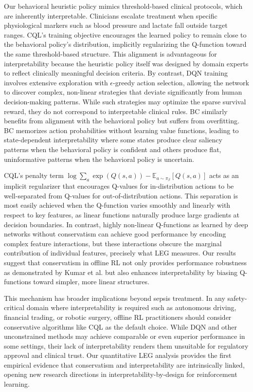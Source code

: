 Our behavioral heuristic policy mimics threshold-based clinical protocols, which are inherently interpretable. Clinicians escalate treatment when specific physiological markers such as blood pressure and lactate fall outside target ranges. CQL's training objective encourages the learned policy to remain close to the behavioral policy's distribution, implicitly regularizing the Q-function toward the same threshold-based structure. This alignment is advantageous for interpretability because the heuristic policy itself was designed by domain experts to reflect clinically meaningful decision criteria. By contrast, DQN training involves extensive exploration with $\epsilon$-greedy action selection, allowing the network to discover complex, non-linear strategies that deviate significantly from human decision-making patterns. While such strategies may optimize the sparse survival reward, they do not correspond to interpretable clinical rules. BC similarly benefits from alignment with the behavioral policy but suffers from overfitting. BC memorizes action probabilities without learning value functions, leading to state-dependent interpretability where some states produce clear saliency patterns when the behavioral policy is confident and others produce flat, uninformative patterns when the behavioral policy is uncertain.

CQL's penalty term $\log \sum_a \exp(Q(s, a)) - \mathbb{E}_{a \sim \pi_\beta} [Q(s, a)]$ acts as an implicit regularizer that encourages Q-values for in-distribution actions to be well-separated from Q-values for out-of-distribution actions. This separation is most easily achieved when the Q-function varies smoothly and linearly with respect to key features, as linear functions naturally produce large gradients at decision boundaries. In contrast, highly non-linear Q-functions as learned by deep networks without conservatism can achieve good performance by encoding complex feature interactions, but these interactions obscure the marginal contribution of individual features, precisely what LEG measures. Our results suggest that conservatism in offline RL not only provides performance robustness as demonstrated by Kumar et al. \citeyearpar{kumar2020cql} but also enhances interpretability by biasing Q-functions toward simpler, more linear structures.

This mechanism has broader implications beyond sepsis treatment. In any safety-critical domain where interpretability is required such as autonomous driving, financial trading, or robotic surgery, offline RL practitioners should consider conservative algorithms like CQL as the default choice. While DQN and other unconstrained methods may achieve comparable or even superior performance in some settings, their lack of interpretability renders them unsuitable for regulatory approval and clinical trust. Our quantitative LEG analysis provides the first empirical evidence that conservatism and interpretability are intrinsically linked, opening new research directions in interpretability-by-design for reinforcement learning.


